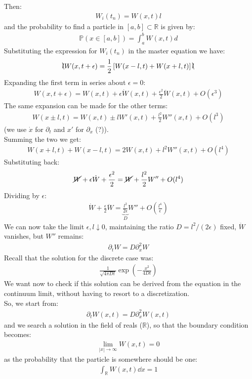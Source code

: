 \documentclass[../template.tex]{subfiles}
\begin{document}
Then:
\begin{align*}
    W_i(t_n) = W(x,t) l
\end{align*}
and the probability to find a particle in $[a,b] \subset \mathbb{R}$ is given by:
\begin{align*}
    \mathbb{P}(x \in [a,b]) = \int_{a}^{b} W(x,t) d
\end{align*} 
Substituting the expression for $W_i(t_n)$ in the master equation we have:
\begin{align*}
    \bcancel{l} W(x,t+ \epsilon) = \frac{1}{2}\left[ W(x-l, t) + W(x+ l, t)\right]\bcancel{ l}
\end{align*}
Expanding the first term in series about $\epsilon = 0$:
\begin{align*}
    W(x,t+\epsilon) = W(x,t) + \epsilon \dot{W}(x,t) + \frac{\epsilon^2}{2} \ddot{W}(x,t) + O(\epsilon^3) 
\end{align*}  
The same expansion can be made for the other terms:
\begin{align*}
    W(x \pm l, t) = W(x,t) \pm l W'(x,t) + \frac{l^2}{2} W''(x,t) + O(l^3) 
\end{align*}
(we use $\dot{x}$ for $\partial_t$  and $x'$ for $\partial_x$ (?)).\\
Summing the two we get:
\begin{align*}
    W(x+l,t) + W(x-l, t) = 2 W(x,t) + l^2 W''(x,t) + O(l^4)
\end{align*}
Substituting back:
\begin{align*}
    \cancel{W }+ \epsilon \dot{W} + \frac{\epsilon^2}{2} = \cancel{W} + \frac{l^2}{2} W'' + O(l^4)  
\end{align*}
Dividing by $\epsilon$:
\begin{align*}
    \dot{W} + \frac{\epsilon}{2} \ddot{W} = \underbrace{\frac{l^2}{2 \epsilon}}_{D}  W'' + O\left(\frac{l^4}{\epsilon} \right)  
\end{align*} 
We can now take the limit $\epsilon, l \downarrow 0$, maintaining the ratio $D = l^2/(2\epsilon)$ fixed, $\ddot{W}$ vanishes, but $W''$ remains:
\begin{align*}
    \partial_t W = D \partial_x^2 W
\end{align*}  
Recall that the solution for the discrete case was:
\begin{align*}
    \frac{1}{\sqrt{4 \pi D t}} \exp\left(-\frac{x^2}{4 D t} \right) 
\end{align*}
We want now to check if this solution can be derived from the equation in the continuum limit, without having to resort to a discretization.\\
So, we start from:
\begin{align*}
    \partial_t W(x,t) = D \partial_x^2 W(x,t)
\end{align*}
and we search a solution in the field of reals ($\mathbb{R}$), so that the boundary condition becomes:
\begin{align*}
    \lim_{|x| \to \infty} W(x,t) = 0
\end{align*}
as the probability that the particle is somewhere should be one:
\begin{align*}
    \int_{\mathbb{R}} W(x,t) \dd{x} = 1
\end{align*}
\end{document}
